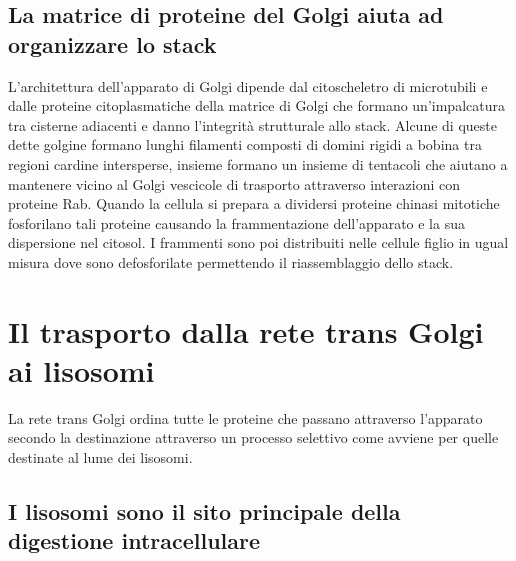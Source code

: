 \subsection{La matrice di proteine del Golgi aiuta ad organizzare lo stack}
L'architettura dell'apparato di Golgi dipende dal citoscheletro di microtubili e dalle proteine citoplasmatiche della matrice di Golgi che formano un'impalcatura tra cisterne adiacenti
e danno l'integrit\`a strutturale allo stack. Alcune di queste dette golgine formano lunghi filamenti composti di domini rigidi a bobina tra regioni cardine intersperse, insieme formano
un insieme di tentacoli che aiutano a mantenere vicino al Golgi vescicole di trasporto attraverso interazioni con proteine Rab. Quando la cellula si prepara a dividersi 
proteine chinasi mitotiche fosforilano tali proteine causando la frammentazione dell'apparato e la sua dispersione nel citosol. I frammenti sono poi distribuiti nelle cellule figlio
in ugual misura dove sono defosforilate permettendo il riassemblaggio dello stack. 
\section{Il trasporto dalla rete trans Golgi ai lisosomi}
La rete trans Golgi ordina tutte le proteine che passano attraverso l'apparato secondo la destinazione attraverso un processo selettivo come avviene per quelle destinate al lume dei 
lisosomi.
\subsection{I lisosomi sono il sito principale della digestione intracellulare}
